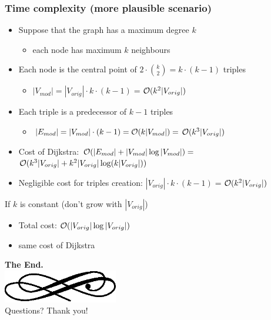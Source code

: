 \begin{frame}
  \frametitle{Time complexity (more plausible scenario)}
  \begin{itemize}
  \item Suppose that the graph has a maximum degree \alert{$k$}\pause
    \begin{itemize}
    \item each node has maximum $k$ \alert{neighbours}\pause
    \end{itemize}
  \item Each \alert{node} is the \alert{central} point of $2\cdot
    \binom{k}{2}=k\cdot(k-1)$ triples\pause
    \begin{itemize}
    \item $|V_{mod}|=|V_{orig}|\cdot k\cdot(k-1)=$\alert{$\mathcal{O}(k^2|V_{orig}|)$}\pause
    \end{itemize}
  \item Each \alert{triple} is a \alert{predecessor} of $k-1$ triples\pause
    \begin{itemize}
    \item $|E_{mod}|=|V_{mod}|\cdot (k-1)=\mathcal{O}(k|V_{mod}|)=$\alert{$\mathcal{O}(k^3|V_{orig}|)$}\pause
    \end{itemize}
  \item Cost of \alert{Dijkstra}: $\mathcal{O}(|E_{mod}|+|V_{mod}|\log
    |V_{mod}|)=$\alert{$\mathcal{O}(k^3|V_{orig}|+ k^2|V_{orig}|\log(k|V_{orig}|))$}\pause
  \item Negligible cost for triples \alert{creation}: $|V_{orig}|\cdot k\cdot
    (k-1)=$\alert{$\mathcal{O}(k^2|V_{orig}|)$}\pause
  \end{itemize}

  \begin{block}{If $k$ is constant (don't grow with $|V_{orig}|$)}
    \begin{itemize}
    \item Total cost: \alert{$\mathcal{O}(|V_{orig}|\log|V_{orig}|)$}\pause
    \item same cost of Dijkstra
    \end{itemize}
  \end{block}
\end{frame}

\begin{frame}
  \begin{center}
	\textbf{\calligra\Huge The End.}\\
  \includegraphics[width=5cm]{img/ornament.eps}\\[1cm]
	\pause
	{\huge\calligra Questions?\pause{} Thank you!}
  \end{center}
\end{frame}
